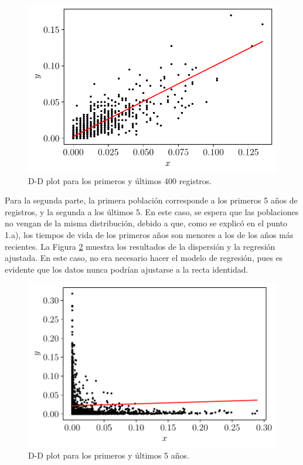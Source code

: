 \documentclass[fleqn]{article}
\begin{document}
\begin{figure}[H]
    \centering
    \includegraphics[scale=.6]{1h_1.pdf}
    \caption{D-D plot para los primeros y últimos 400 registros.}
    \label{fig:1h1}
\end{figure}

Para la segunda parte, la primera población corresponde a los primeros 5 años de registros, y la segunda a los últimos 5. En este caso, se espera que las poblaciones no vengan de la misma distribución, debido a que, como se explicó en el punto 1.a), los tiempos de vida de los primeros años son menores a los de los años más recientes. La Figura \ref{fig:1h2} muestra los resultados de la dispersión y la regresión ajustada. En este caso, no era necesario hacer el modelo de regresión, pues es evidente que los datos nunca podrían ajustarse a la recta identidad.

\begin{figure}[H]
    \centering
    \includegraphics[scale=.6]{1h_2.pdf}
    \caption{D-D plot para los primeros y últimos 5 años.}
    \label{fig:1h2}
\end{figure}
\end{document}
